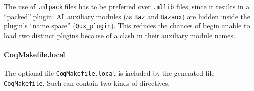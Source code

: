 The use of \texttt{.mlpack} files has to be preferred over \texttt{.mllib}
files, since it results in a ``packed'' plugin: All auxiliary
modules (as {\tt Baz} and {\tt Bazaux}) are hidden inside
the plugin's ``name space'' ({\tt Qux\_plugin}).
This reduces the chances of begin unable to load two distinct plugins
because of a clash in their auxiliary module names.

\paragraph{CoqMakefile.local} %
\label{coqmakefile:local}

The optional file {\tt CoqMakefile.local} is included by the generated file
{\tt CoqMakefile}.  Such can contain two kinds of directives.

